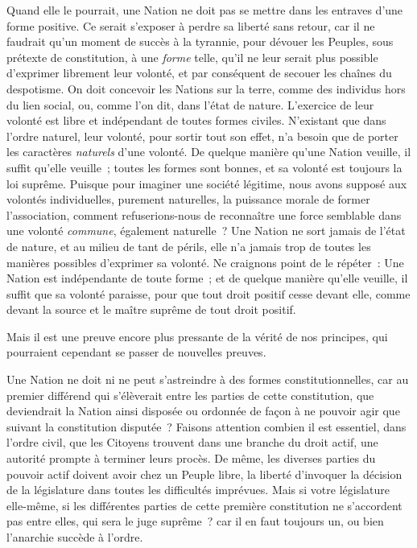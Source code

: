 \documentclass[french,twoside]{book} %
\begin{document}
Quand elle le pourrait, une Nation ne doit pas se mettre dans les entraves d’une forme positive. Ce serait s’exposer à perdre sa liberté sans retour, car il ne faudrait qu’un moment de succès à la tyrannie, pour dévouer les Peuples, sous prétexte de constitution, à une {\itshape forme} telle, qu’il ne leur serait plus possible d’exprimer librement leur volonté, et par conséquent de secouer les chaînes du despotisme. On doit concevoir les Nations sur la terre, comme des individus hors du lien social, ou, comme l’on dit, dans l’état de nature. L’exercice de leur volonté est libre et indépendant de toutes formes civiles. N’existant que dans l’ordre naturel, leur volonté, pour sortir tout son effet, n’a besoin que de porter les caractères {\itshape naturels} d’une volonté. De quelque manière qu’une Nation veuille, il suffit qu’elle veuille ; toutes les formes sont bonnes, et sa volonté est toujours la loi suprême. Puisque pour imaginer une société légitime, nous avons supposé aux volontés individuelles, purement naturelles, la puissance morale de former l’association, comment refuserions-nous de reconnaître une force semblable dans une volonté {\itshape commune}, également naturelle ? Une Nation ne sort jamais de l’état de nature, et au milieu de tant de périls, elle n’a jamais trop de toutes les manières possibles d’exprimer sa volonté. Ne craignons point de le répéter : Une Nation est indépendante de toute forme ; et de quelque manière qu’elle veuille, il suffit que sa volonté paraisse, pour que tout droit positif cesse devant elle, comme devant la source et le maître suprême de tout droit positif.\par
Mais il est une preuve encore plus pressante de la vérité de nos principes, qui pourraient cependant se passer de nouvelles preuves.\par
Une Nation ne doit ni ne peut s’astreindre à des formes constitutionnelles, car au premier différend qui s’élèverait entre les parties de cette constitution, que deviendrait la Nation ainsi disposée ou ordonnée de façon à ne pouvoir agir que suivant la constitution disputée ? Faisons attention combien il est essentiel, dans l’ordre civil, que les Citoyens trouvent dans une branche du droit actif, une autorité prompte à terminer leurs procès. De même, les diverses parties du pouvoir actif doivent avoir chez un Peuple libre, la liberté d’invoquer la décision de la législature dans toutes les difficultés imprévues. Mais si votre législature elle-même, si les différentes parties de cette première constitution ne s’accordent pas entre elles, qui sera le juge suprême ? car il en faut toujours un, ou bien l’anarchie succède à l’ordre.\par
\end{document}
